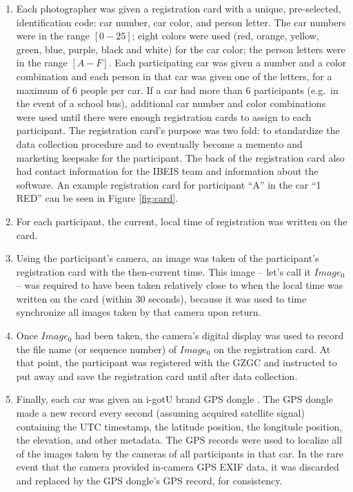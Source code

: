 \begin{enumerate}
	\item Each photographer was given a registration card with a unique, pre-selected, identification code: car number, car color, and person letter. The car numbers were in the range $[0-25]$; eight colors were used (red, orange, yellow, green, blue, purple, black and white) for the car color; the person letters were in the range $[A-F]$.  Each participating car was given a number and a color combination and each person in that car was given one of the letters, for a maximum of 6 people per car. If a car had more than 6 participants (e.g.\ in the event of a school bus), additional car number and color combinations were used until there were enough registration cards to assign to each participant.  The registration card's purpose was two fold: to standardize the data collection procedure and to eventually become a memento and marketing keepsake for the participant.  The back of the registration card also had contact information for the IBEIS team and information about the software.  An example registration card for participant ``A'' in the car ``1 RED'' can be seen in Figure \ref{fig:card}.
	\item For each participant, the current, local time of registration was written on the card.
	\item Using the participant's camera, an image was taken of the participant's registration card with the then-current time.  This image -- let's call it $Image_0$ -- was required to have been taken relatively close to when the local time was written on the card (within 30 seconds), because it was used to time synchronize all images taken by that camera upon return.
	\item Once $Image_0$ had been taken, the camera's digital display was used to record the file name (or sequence number) of $Image_0$ on the registration card.  At that point, the participant was registered with the GZGC and instructed to put away and save the registration card until after data collection.
	\item Finally, each car was given an i-gotU brand GPS dongle \cite{_http://www.i-gotu.com/product/usb_gps.html_2015}.   The GPS dongle made a new record every second (assuming acquired satellite signal) containing the UTC timestamp, the latitude position, the longitude position, the elevation, and other metadata.  The GPS records were used to localize all of the images taken by the cameras of all participants in that car.  In the rare event that the camera provided in-camera GPS EXIF data, it was discarded and replaced by the GPS dongle's GPS record, for consistency.
\end{enumerate}	

